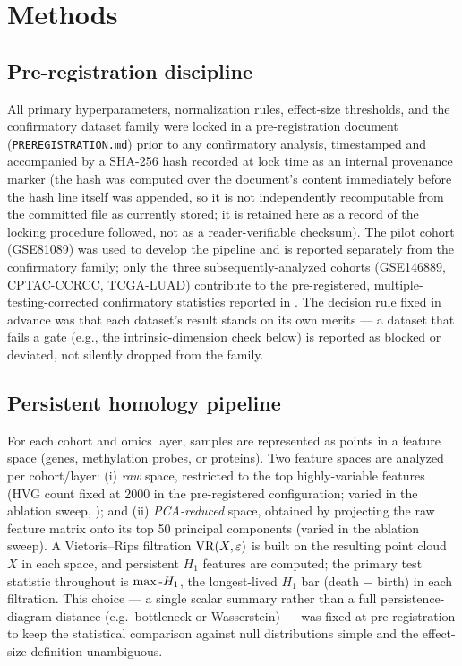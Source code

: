 \section{Methods}
\label{sec:methods}

\subsection{Pre-registration discipline}

All primary hyperparameters, normalization rules, effect-size thresholds, and the confirmatory dataset family were locked in a pre-registration document (\texttt{PREREGISTRATION.md}) prior to any confirmatory analysis, timestamped and accompanied by a SHA-256 hash recorded at lock time as an internal provenance marker (the hash was computed over the document's content immediately before the hash line itself was appended, so it is not independently recomputable from the committed file as currently stored; it is retained here as a record of the locking procedure followed, not as a reader-verifiable checksum). The pilot cohort (GSE81089) was used to develop the pipeline and is reported separately from the confirmatory family; only the three subsequently-analyzed cohorts (GSE146889, CPTAC-CCRCC, TCGA-LUAD) contribute to the pre-registered, multiple-testing-corrected confirmatory statistics reported in . The decision rule fixed in advance was that each dataset's result stands on its own merits --- a dataset that fails a gate (e.g., the intrinsic-dimension check below) is reported as blocked or deviated, not silently dropped from the family.

\subsection{Persistent homology pipeline}

For each cohort and omics layer, samples are represented as points in a feature space (genes, methylation probes, or proteins). Two feature spaces are analyzed per cohort/layer: (i) \emph{raw} space, restricted to the top highly-variable features (HVG count fixed at 2000 in the pre-registered configuration; varied in the ablation sweep, ); and (ii) \emph{PCA-reduced} space, obtained by projecting the raw feature matrix onto its top 50 principal components (varied in the ablation sweep). A Vietoris--Rips filtration $\mathrm{VR}(X,\varepsilon)$ is built on the resulting point cloud $X$ in each space, and persistent $H_1$ features are computed; the primary test statistic throughout is $\max\text{-}H_1$, the longest-lived $H_1$ bar (death $-$ birth) in each filtration. This choice --- a single scalar summary rather than a full persistence-diagram distance (e.g.\ bottleneck or Wasserstein) --- was fixed at pre-registration to keep the statistical comparison against null distributions simple and the effect-size definition unambiguous.

